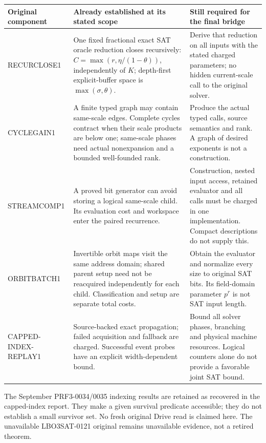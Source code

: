 \documentclass[11pt]{article}
\begin{document}
\begin{center}\small
\begin{tabularx}{\textwidth}{p{}XX}
\toprule
Original component & Already established at its stated scope & Still required for the final bridge\\
\midrule
RECURCLOSE1 & One fixed fractional exact SAT oracle reduction closes recursively:
$C=\max(r,\eta/(1-\theta))$, independently of $K$; depth-first explicit-buffer
space is $\max(\sigma,\theta)$. & Derive that reduction on all inputs with the
stated charged parameters; no hidden current-scale call to the original solver.\\
CYCLEGAIN1 & A finite typed graph may contain same-scale edges. Complete cycles
contract when their scale products are below one; same-scale phases need actual
nonexpansion and a bounded well-founded rank. & Produce the actual typed calls,
source semantics and rank. A graph of desired exponents is not a construction.\\
STREAMCOMP1 & A proved bit generator can avoid storing a logical same-scale
child. Its evaluation cost and workspace enter the paired recurrence. &
Construction, nested input access, retained evaluator and all calls must be
charged in one implementation. Compact descriptions do not supply this.\\
ORBITBATCH1 & Invertible orbit maps visit the same address domain; shared parent
setup need not be reacquired independently for each child. Classification and
setup are separate total costs. & Obtain the evaluator and normalize every size
to original SAT bits. Its field-domain parameter $p^r$ is not SAT input length.\\
CAPPED-INDEX-REPLAY1 & Source-backed exact propagation; failed acquisition and
fallback are charged. Successful event probes have an explicit width-dependent
bound. & Bound all solver phases, branching and physical machine resources.
Logical counters alone do not provide a favorable joint SAT bound.\\
\bottomrule
\end{tabularx}
\end{center}

The September PRF3-0034/0035 indexing results are retained as recovered in the
capped-index report. They make a given survival predicate accessible; they do
not establish a small survivor set. No fresh original Drive read is claimed
here. The unavailable LBO3SAT-0121 original remains unavailable evidence, not a
retired theorem.
\end{document}
